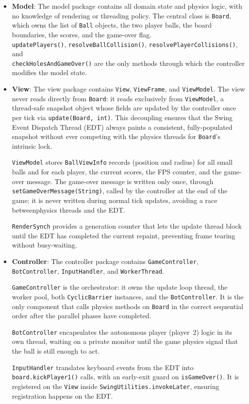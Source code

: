 \documentclass[12pt,a4paper]{article}
\begin{document}
 \begin{itemize}
        \item \textbf{Model}: The model package contains all domain state and physics logic, with no knowledge of rendering or threading policy. The central class is \texttt{Board}, which owns the list of \texttt{Ball} objects, the two player balls, the board boundaries, the scores, and the game-over flag.\\
\texttt{updatePlayers()}, \texttt{resolveBallCollision()}, \texttt{resolvePlayerCollisions()}, and \\
\texttt{checkHolesAndGameOver()} are the only methods through which the controller modifies the model state.
	
	\item \textbf{View}: The view package contains \texttt{View}, \texttt{ViewFrame}, and \texttt{ViewModel}. The view never reads directly from \texttt{Board}: it reads exclusively from \texttt{ViewModel}, a thread-safe snapshot object whose fields are updated by the controller once per tick via \texttt{update(Board, int)}. This decoupling ensures that the Swing Event Dispatch Thread (EDT) always paints a consistent, fully-populated snapshot without ever competing with the physics threads for \texttt{Board}'s intrinsic lock.
 
\texttt{ViewModel} stores \texttt{BallViewInfo} records (position and radius) for all small balls and for each player, the current scores, the FPS counter, and the game-over message. The game-over message is written only once, through \texttt{setGameOverMessage(String)}, called by the controller at the end of the game; it is never written during normal tick updates, avoiding a race betweenphysics threads and the EDT.
 
\texttt{RenderSynch} provides a generation counter that lets the update thread block until the EDT has completed the current repaint, preventing frame tearing without busy-waiting.

	\item \textbf{Controller}: The controller package contains \texttt{GameController}, \texttt{BotController},
\texttt{InputHandler}, and \texttt{WorkerThread}.
 
\texttt{GameController} is the orchestrator: it owns the update loop thread, the worker pool, both \texttt{CyclicBarrier} instances, and the \texttt{BotController}. It is the only component that calls physics methods on \texttt{Board} in the correct sequential order after the parallel phases have completed.
 
\texttt{BotController} encapsulates the autonomous player (player~2) logic in its own thread, waiting on a private monitor until the game physics signal that the ball is still enough to act.
 
\texttt{InputHandler} translates keyboard events from the EDT into \texttt{board.kickPlayer1()} calls, with an early-exit guard on \texttt{isGameOver()}. It is registered on the \texttt{View} inside \texttt{SwingUtilities.invokeLater}, ensuring registration happens on the EDT.
 \end{itemize}
 
\end{document}
